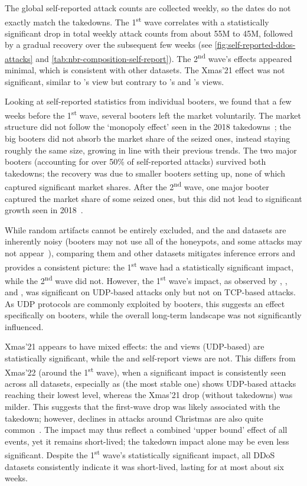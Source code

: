 \documentclass[letterpaper,twocolumn,10pt]{article}
\begin{document}
 The global self-reported attack counts are collected weekly, so the dates do not exactly match the takedowns. The 1\textsuperscript{st} wave correlates with a statistically significant drop in total weekly attack counts from about 55M to 45M, followed by a gradual recovery over the subsequent few weeks (see \autoref{fig:self-reported-ddos-attacks} and \autoref{tab:nbr-composition-self-report}). The 2\textsuperscript{nd} wave's effects appeared minimal, which is consistent with other datasets. The Xmas'21 effect was not significant, similar to \amppot's view but contrary to \hopscotch's and \netscout's views.

Looking at self-reported statistics from individual booters, we found that a few weeks before the 1\textsuperscript{st} wave, several booters left the market voluntarily. The market structure did not follow the `monopoly effect' seen in the 2018 takedowns~\cite{collier2019booting}; the big booters did not absorb the market share of the seized ones, instead staying roughly the same size, growing in line with their previous trends. The two major booters (accounting for over 50\% of self-reported attacks) survived both takedowns; the recovery was due to smaller booters setting up, none of which captured significant market shares. After the 2\textsuperscript{nd} wave, one major booter captured the market share of some seized ones, but this did not lead to significant growth seen in 2018~\cite{collier2019booting}.

 While random artifacts cannot be entirely excluded, and the \hopscotch and \amppot datasets are inherently noisy (booters may not use all of the honeypots, and some attacks may not appear~\cite{griffioen2021scan}), comparing them and other datasets mitigates inference errors and provides a consistent picture: the 1\textsuperscript{st} wave had a statistically significant impact, while the 2\textsuperscript{nd} wave did not. However, the 1\textsuperscript{st} wave's impact, as observed by \hopscotch, \amppot, and \netscout, was significant on UDP-based attacks only but not on TCP-based attacks. As UDP protocols are commonly exploited by booters, this suggests an effect specifically on booters, while the overall long-term landscape was not significantly influenced. 

Xmas'21 appears to have mixed effects: the \hopscotch and \netscout views (UDP-based) are statistically significant, while the \amppot and self-report views are not. This differs from Xmas'22 (around the 1\textsuperscript{st} wave), when a significant impact is consistently seen across all datasets, especially as \netscout (the most stable one) shows UDP-based attacks reaching their lowest level, whereas the Xmas'21 drop (without takedowns) was milder. This suggests that the first-wave drop was likely associated with the takedown; however, declines in attacks around Christmas are also quite common~\cite{hiesgen2024age}. The impact may thus reflect a combined `upper bound' effect of all events, yet it remains short-lived; the takedown impact alone may be even less significant. Despite the 1\textsuperscript{st} wave's statistically significant impact, all DDoS datasets consistently indicate it was short-lived, lasting for at most about six weeks.
\end{document}
